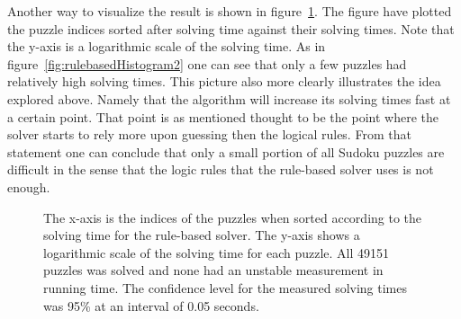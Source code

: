 \documentclass[a4paper,11pt]{kth-mag}
\begin{document}
\FloatBarrier
Another way to visualize the result is shown in figure~\ref{fig:rulebasedIndices}.
The figure have plotted the puzzle indices sorted after solving time against their solving times.
Note that the y-axis is a logarithmic scale of the solving time.
As in figure~\ref{fig:rulebasedHistogram2} one can see that only a few puzzles had relatively high solving times.
This picture also more clearly illustrates the idea explored above.
Namely that the algorithm will increase its solving times fast at a certain point.
That point is as mentioned thought to be the point where the solver starts to rely more upon guessing then the logical rules.
From that statement one can conclude that only a small portion of all Sudoku puzzles are difficult in the sense that the logic rules that the rule-based solver uses is not enough.
\\
\begin{figure}[here] 
\noindent{}
\vspace{-25pt}
\caption[Plot of solved puzzles using rule-based solver]{The x-axis is the indices of the puzzles when sorted according to the solving time for the rule-based solver. The y-axis shows a logarithmic scale of the solving time for each puzzle. All 49151 puzzles was solved and none had an unstable measurement in running time. The confidence level for the measured solving times was 95\% at an interval of 0.05 seconds.}
\label{fig:rulebasedIndices}
\end{figure}

\FloatBarrier
\end{document}
